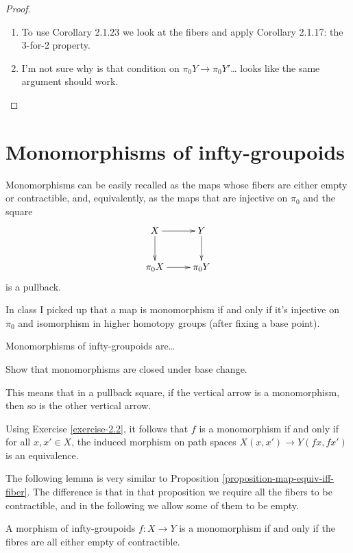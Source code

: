 \begin{proof}
\begin{enumerate}
\item To use Corollary 2.1.23 we look at the
fibers and apply
 Corollary 2.1.17: the 3-for-2 property.
\item I'm not sure why is that condition on
$\pi_0Y \to \pi_0Y'$… looks like the same
argument should work.
\end{enumerate}
\end{proof}

\section{Monomorphisms of infty-groupoids}
\label{section-monomorphisms}

\noindent
Monomorphisms can be easily recalled
as the maps whose fibers are either empty or
contractible,
and, equivalently, as the maps that are
injective on $\pi_0$ and the square
$$
\xymatrix{
X\ar[r]\ar[d]&Y\ar[d]\\
\pi_0X\ar[r]&\pi_0Y
}
$$
is a pullback.

In class I picked up that a map is
monomorphism if and only if it's injective on
$\pi_0$
and isomorphism in higher homotopy groups
(after fixing a base point).

Monomorphisms of infty-groupoids are…

\begin{exercise}[2.6]
\label{exercise-2.6}
Show that monomorphisms are closed
under base change.
\end{exercise}

This means that in a pullback square,
if the vertical arrow
is a monomorphism, then so is the
other vertical arrow.

\begin{remark}
\label{remark-monomorphism-equivalence}
Using Exercise \ref{exercise-2.2}, it follows
that $f$ is a monomorphism
if and only if for all $x,x' \in X$, the
induced
morphism on path spaces $X(x,x') \to
Y(fx,fx')$ is
an equivalence.
\end{remark}

\noindent
The following lemma is very similar to
Proposition
\ref{proposition-map-equiv-iff-fiber}.
The difference is that in that proposition we
require all the fibers to be contractible,
and in the following we allow some of them to
be empty.

\begin{lemma}
\label{lemma-monom-iff-fibre-empty-contr}
A morphism of infty-groupoids $f:X \to Y$
is
a monomorphism if and only if the fibres are
all
either empty of contractible.
\end{lemma}


